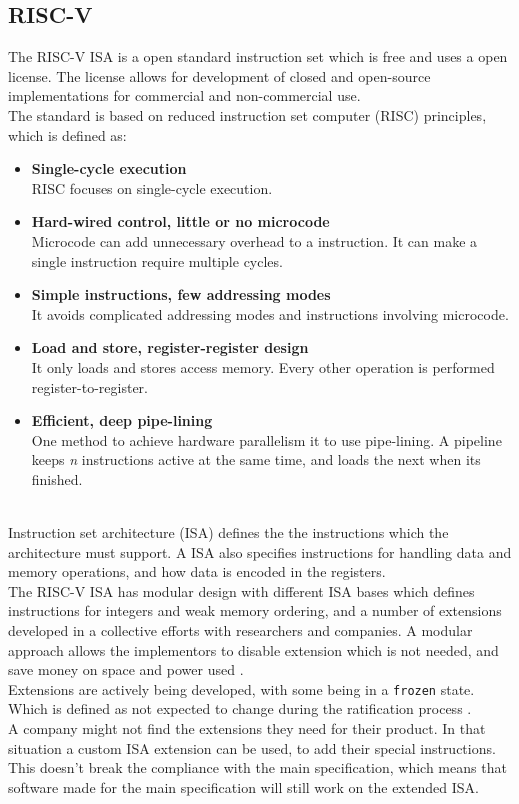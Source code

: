 \subsection{RISC-V}
The RISC-V ISA is a open standard instruction set which is free and uses a open license. The license allows for development of closed and open-source implementations for commercial and non-commercial use.\\
The standard is based on reduced instruction set computer (RISC) principles, which is defined as:
\begin{itemize}
    \item \textbf{Single-cycle execution}\\RISC focuses on single-cycle execution.
    \item \textbf{Hard-wired control, little or no microcode}\\Microcode can add unnecessary overhead to a instruction. It can make a single instruction require multiple cycles.
    \item \textbf{Simple instructions, few addressing modes}\\It avoids complicated addressing modes and instructions involving microcode. 
    \item \textbf{Load and store, register-register design}\\It only loads and stores access memory. Every other operation is performed register-to-register.
    \item \textbf{Efficient, deep pipe-lining}\\One method to achieve hardware parallelism it to use pipe-lining. A pipeline keeps \textit{n} instructions active at the same time, and loads the next when its finished.
\end{itemize}
\\
Instruction set architecture (ISA) defines the the instructions which the architecture must support. A ISA also specifies instructions for handling data and memory operations, and how data is encoded in the registers.
\\
The RISC-V ISA has modular design with different ISA bases which defines instructions for integers and weak memory ordering, and a number of extensions developed in a collective efforts with researchers and companies.
A modular approach allows the implementors to disable extension which is not needed, and save money on space and power used \cite{extendrisc}. \\
Extensions are actively being developed, with some being in a \texttt{frozen} state. Which is defined as not expected to change during the ratification process \cite{riscmanual}.
\\
A company might not find the extensions they need for their product. In that situation a custom ISA extension can be used, to add their special instructions. 
This doesn't break the compliance with the main specification, which means that software made for the main specification will still work on the extended ISA.




